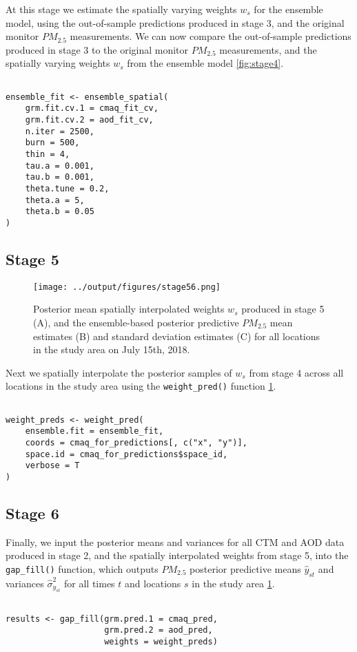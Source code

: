 \documentclass[12pt]{article}
\begin{document}
At this stage we estimate the spatially varying weights $w_s$ for the ensemble model, using the out-of-sample predictions produced in stage 3, and the original monitor $PM_{2.5}$ measurements.
We can now compare the out-of-sample predictions produced in stage 3 to the original monitor $PM_{2.5}$ measurements, and the spatially varying weights $w_s$ from the ensemble model \ref{fig:stage4}.

\begin{lstlisting}

ensemble_fit <- ensemble_spatial(
    grm.fit.cv.1 = cmaq_fit_cv,
    grm.fit.cv.2 = aod_fit_cv,
    n.iter = 2500,
    burn = 500,
    thin = 4,
    tau.a = 0.001,
    tau.b = 0.001,
    theta.tune = 0.2,
    theta.a = 5,
    theta.b = 0.05
)

\end{lstlisting}


\subsection*{Stage 5}


\begin{figure}[ht]
    \centering
    \texttt{[image: ../output/figures/stage56.png]}
    \caption{Posterior mean spatially interpolated weights $w_s$ produced in stage 5 (A), and the ensemble-based posterior predictive $PM_{2.5}$ mean estimates (B) and standard deviation estimates (C) for all locations in the study area on July 15th, 2018.}
    \label{fig:stage56}
\end{figure}

Next we spatially interpolate the posterior samples of $w_s$ from stage 4 across all locations in the study area using the \texttt{weight\_pred()} function \ref{fig:stage56}.

\begin{lstlisting}

weight_preds <- weight_pred(
    ensemble.fit = ensemble_fit,
    coords = cmaq_for_predictions[, c("x", "y")],
    space.id = cmaq_for_predictions$space_id,
    verbose = T
)

\end{lstlisting}

\subsection*{Stage 6}

Finally, we input the posterior means and variances for all CTM and AOD data produced in stage 2, and the spatially interpolated weights from stage 5, into the \texttt{gap\_fill()} function, which outputs $PM_{2.5}$ posterior predictive means $\hat{y}_{st}$ and variances $\hat{\sigma}^{2}_{y_{st}}$ for all times $t$ and locations $s$ in the study area \ref{fig:stage56}.



\begin{lstlisting}

results <- gap_fill(grm.pred.1 = cmaq_pred,
                    grm.pred.2 = aod_pred,
                    weights = weight_preds)

\end{lstlisting}



\printbibliography
\end{document}
